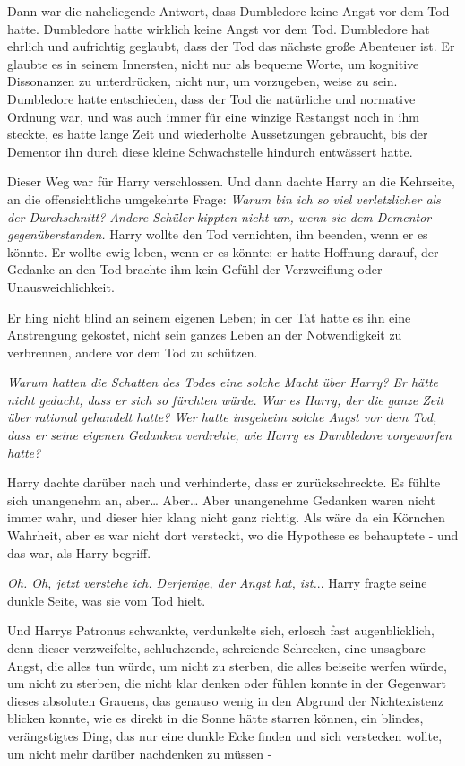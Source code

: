 {Dann war die naheliegende Antwort, dass Dumbledore keine Angst vor dem Tod hatte. Dumbledore hatte wirklich keine Angst vor dem Tod. Dumbledore hat ehrlich und aufrichtig geglaubt, dass der Tod das nächste große Abenteuer ist. Er glaubte es in seinem Innersten, nicht nur als bequeme Worte, um kognitive Dissonanzen zu unterdrücken, nicht nur, um vorzugeben, weise zu sein. Dumbledore hatte entschieden, dass der Tod die natürliche und normative Ordnung war, und was auch immer für eine winzige Restangst noch in ihm steckte, es hatte lange Zeit und wiederholte Aussetzungen gebraucht, bis der Dementor ihn durch diese kleine Schwachstelle hindurch entwässert hatte.

Dieser Weg war für Harry verschlossen. Und dann dachte Harry an die Kehrseite, an die offensichtliche umgekehrte Frage: \emph{Warum bin ich so viel verletzlicher als der Durchschnitt? Andere Schüler kippten nicht um, wenn sie dem Dementor gegenüberstanden.} Harry wollte den Tod vernichten, ihn beenden, wenn er es könnte. Er wollte ewig leben, wenn er es könnte; er hatte Hoffnung darauf, der Gedanke an den Tod brachte ihm kein Gefühl der Verzweiflung oder Unausweichlichkeit.

Er hing nicht blind an seinem eigenen Leben; in der Tat hatte es ihn eine Anstrengung gekostet, nicht sein ganzes Leben an der Notwendigkeit zu verbrennen, andere vor dem Tod zu schützen.

\emph{Warum hatten die Schatten des Todes eine solche Macht über Harry? Er hätte nicht gedacht, dass er sich so fürchten würde. War es Harry, der die ganze Zeit über} \emph{rational gehandelt hatte? Wer hatte insgeheim solche Angst vor dem Tod, dass er seine eigenen Gedanken verdrehte, wie Harry es Dumbledore vorgeworfen hatte?}

Harry dachte darüber nach und verhinderte, dass er zurückschreckte. Es fühlte sich unangenehm an, aber… Aber… Aber unangenehme Gedanken waren nicht immer wahr, und dieser hier klang nicht ganz richtig. Als wäre da ein Körnchen Wahrheit, aber es war nicht dort versteckt, wo die Hypothese es behauptete - und das war, als Harry begriff.

\emph{Oh. Oh, jetzt verstehe ich. Derjenige, der Angst hat, ist.}.. Harry fragte seine dunkle Seite, was sie vom Tod hielt.

Und Harrys Patronus schwankte, verdunkelte sich, erlosch fast augenblicklich, denn dieser verzweifelte, schluchzende, schreiende Schrecken, eine unsagbare Angst, die alles tun würde, um nicht zu sterben, die alles beiseite werfen würde, um nicht zu sterben, die nicht klar denken oder fühlen konnte in der Gegenwart dieses absoluten Grauens, das genauso wenig in den Abgrund der Nichtexistenz blicken konnte, wie es direkt in die Sonne hätte starren können, ein blindes, verängstigtes Ding, das nur eine dunkle Ecke finden und sich verstecken wollte, um nicht mehr darüber nachdenken zu müssen -

}
